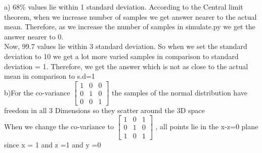 \documentclass[12pt]{article}
\newenvironment{theorem}[2][Theorem]{\begin{trivlist}
\item[\hskip \labelsep {\bfseries #1}\hskip \labelsep {\bfseries #2.}]}{\end{trivlist}}
\begin{document}
\begin{theorem}[Ans]{7}
\end{theorem}
   a) 68\% values lie within 1 standard deviation. According to the Central limit theorem, when we increase number of samples we get answer nearer to the actual mean. Therefore, as we increase the number of samples in simulate.py we get the answer nearer to 0.\\
    Now, 99.7 values lie within 3 standard deviation. So when we set the standard deviation to 10 we get a lot more varied samples in comparison to standard deviation = 1. Therefore, we get the answer which is not as close to the actual mean in comparison to s.d=1 \\
b)For the co-variance $\begin{bmatrix}
    1 & 0 & 0 \\
    0 & 1 & 0 \\
    0 & 0 & 1 
\end{bmatrix}$ the samples of the normal distribution have freedom in all 3 Dimensions so they scatter around the 3D space
\\When we change the co-variance to 
$\begin{bmatrix}
    1 & 0 & 1 \\
    0 & 1 & 0 \\
    1 & 0 & 1 
\end{bmatrix}$
, all points lie in the x-z=0 plane since x = 1 and z =1 and y =0
 
\end{document}
